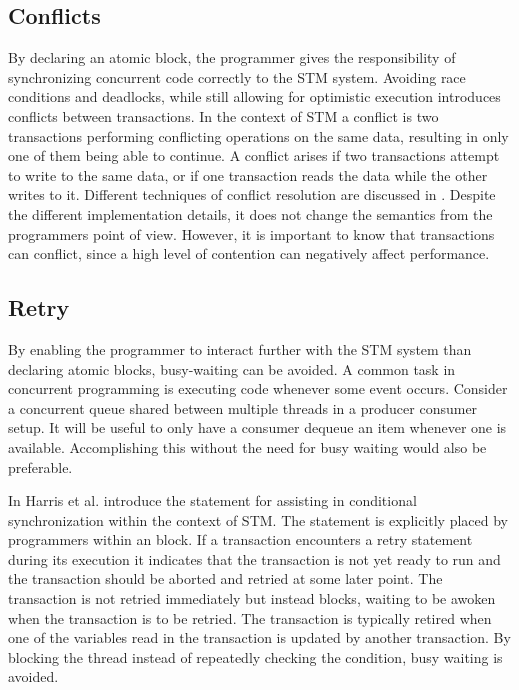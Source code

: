 \subsection{Conflicts}
By declaring an atomic block, the programmer gives the responsibility of synchronizing concurrent code correctly to the \ac{STM} system. Avoiding race conditions and deadlocks, while still allowing for optimistic execution introduces conflicts between transactions. In the context of \ac{STM} a conflict is two transactions performing conflicting operations on the same data, resulting in only one of them being able to continue\cite[p. 20]{harris2010transactional}. A conflict arises if two transactions attempt to write to the same data, or if one transaction reads the data while the other writes to it. Different techniques of conflict resolution are discussed in \cite[p. 45-46 \& 52-55]{dpt907e14trending}. Despite the different implementation details, it does not change the semantics from the programmers point of view. However, it is important to know that transactions can conflict, since a high level of contention can negatively affect performance\cite[p. 52]{dpt907e14trending}.

\subsection{Retry}
By enabling the programmer to interact further with the \ac{STM} system than declaring atomic blocks, busy-waiting can be avoided. A common task in concurrent programming is executing code whenever some event occurs. Consider a concurrent queue shared between multiple threads in a producer consumer setup. It will be useful to only have a consumer dequeue an item whenever one is available. Accomplishing this without the need for busy waiting would also be preferable.

In \cite{harris2005composable} Harris et al. introduce the  statement for assisting in conditional synchronization within the context of \ac{STM}. The  statement is explicitly placed by programmers within an  block. If a transaction encounters a retry statement during its execution it indicates that the transaction is not yet ready to run and the transaction should be aborted and retried at some later point\cite[p. 73]{harris2010transactional}. The transaction is not retried immediately but instead blocks, waiting to be awoken when the transaction is to be retried. The transaction is typically retired when one of the variables read in the transaction is updated by another transaction\cite[p. 51]{harris2005composable}. By blocking the thread instead of repeatedly checking the condition, busy waiting is avoided.

